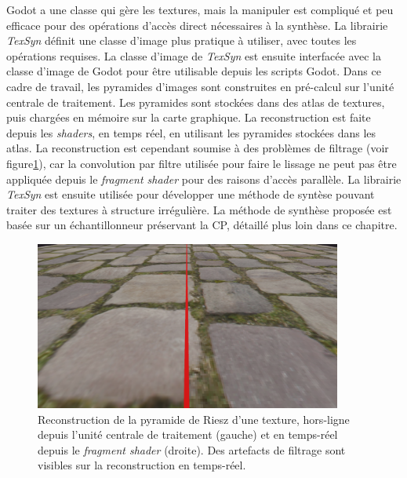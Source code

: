 \bigskip

Godot a une classe qui gère les textures, mais la manipuler est compliqué et peu efficace pour des opérations d'accès direct nécessaires à la synthèse. La librairie \textit{TexSyn} définit une classe d'image plus pratique à utiliser, avec toutes les opérations requises. La classe d'image de \textit{TexSyn} est ensuite interfacée avec la classe d'image de Godot pour être utilisable depuis les scripts Godot. Dans ce cadre de travail, les pyramides d'images sont construites en pré-calcul sur l'unité centrale de traitement. Les pyramides sont stockées dans des atlas de textures, puis chargées en mémoire sur la carte graphique. La reconstruction est faite depuis les \textit{shaders}, en temps réel, en utilisant les pyramides stockées dans les atlas. La reconstruction est cependant soumise à des problèmes de filtrage (voir figure\ref{fig:texsyn-reconstruction}), car la convolution par filtre utilisée pour faire le lissage ne peut pas être appliquée depuis le \textit{fragment shader} pour des raisons d'accès parallèle. La librairie \textit{TexSyn} est ensuite utilisée pour développer une méthode de syntèse pouvant traiter des textures à structure irrégulière. La méthode de synthèse proposée est basée sur un échantillonneur préservant la CP, détaillé plus loin dans ce chapitre.

\begin{figure}
    \centering
    \includegraphics[width=0.9\textwidth]{contenu/resources/images/reconstruction_cpu_vs_gpu}
    \caption[Reconstruction de texture dans \textit{TexSyn}]{Reconstruction de la pyramide de Riesz d'une texture, hors-ligne depuis l'unité centrale de traitement (gauche) et en temps-réel depuis le \textit{fragment shader} (droite). Des artefacts de filtrage sont visibles sur la reconstruction en temps-réel.}
    \label{fig:texsyn-reconstruction}
\end{figure}


